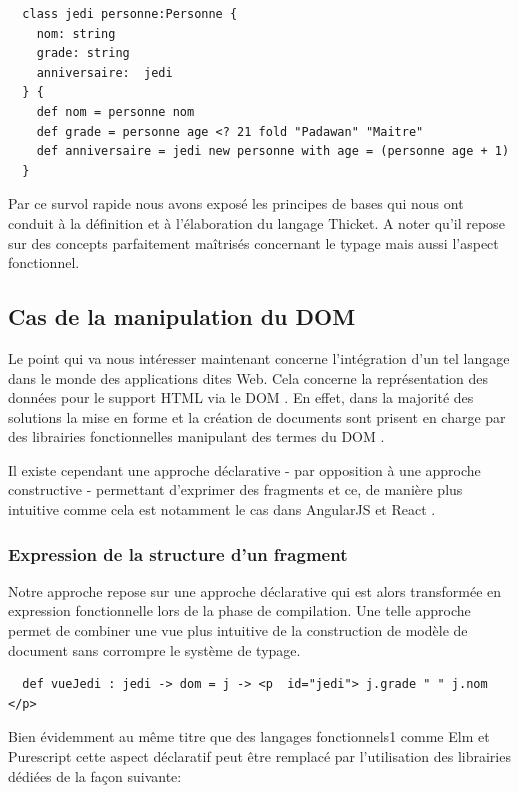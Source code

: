 \documentclass[twoside,a4paper]{article}
\begin{document}
\lstset{language=Thicket}
\begin{lstlisting}
  class jedi personne:Personne {
    nom: string
    grade: string
    anniversaire:  jedi
  } {
    def nom = personne nom
    def grade = personne age <? 21 fold "Padawan" "Maitre"
    def anniversaire = jedi new personne with age = (personne age + 1)
  }
\end{lstlisting}

Par ce survol rapide nous avons exposé les principes de bases qui nous
ont conduit à la définition et  à l'élaboration du langage Thicket.  A
noter qu'il repose sur  des concepts parfaitement maîtrisés concernant
le typage mais aussi l'aspect fonctionnel.

\subsection{Cas de la manipulation du DOM}

Le point qui va nous intéresser maintenant concerne l'intégration d'un
tel langage dans  le monde des applications dites  Web.  Cela concerne
la  représentation  des  données  pour  le support  HTML  via  le  DOM
\cite{dom}. En effet, dans la majorité  des solutions la mise en forme
et la création de documents sont  prisent en charge par des librairies
fonctionnelles manipulant des termes du DOM \cite{dom}.

Il existe  cependant une approche  déclarative - par opposition  à une
approche constructive -  permettant d'exprimer des fragments  et ce, de
manière plus intuitive comme cela  est notamment le cas dans AngularJS
\cite{angularjs} et React \cite{react}.

\subsubsection{Expression de la structure d'un fragment}

Notre  approche repose  sur  une approche  déclarative  qui est  alors
transformée  en   expression  fonctionnelle   lors  de  la   phase  de
compilation.   Une telle  approche  permet de  combiner  une vue  plus
intuitive de la  construction de modèle de document  sans corrompre le
système de typage.

\lstset{language=Thicket}
\begin{lstlisting}
  def vueJedi : jedi -> dom = j -> <p  id="jedi"> j.grade " " j.nom </p> 
\end{lstlisting}

Bien évidemment au même titre que des langages fonctionnels1 comme Elm
et  Purescript   cette  aspect  déclaratif  peut   être  remplacé  par
l'utilisation des librairies dédiées de la façon suivante:
\end{document}
